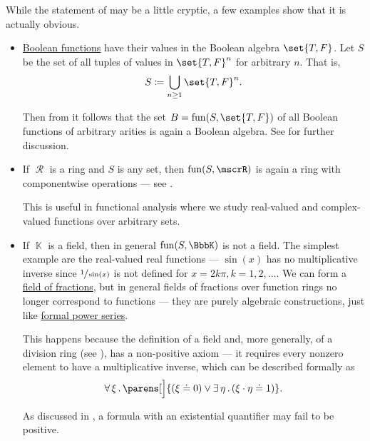 \begin{example}\label{ex:thm:functions_over_model_of_positive_formulas_form_model}
  While the statement of  may be a little cryptic, a few examples show that it is actually obvious.
  \begin{itemize}
    \item \hyperref[def:boolean_function]{Boolean functions} have their values in the Boolean algebra \( \set{ T, F } \). Let \( S \) be the set of all tuples of values in \( \set{ T, F }^n \) for arbitrary \( n \). That is,
    \begin{equation*}
      S \coloneqq \bigcup_{n \geq 1} \set{ T, F }^n.
    \end{equation*}

    Then from  it follows that the set \( B = \fun(S, \set{ T, F }) \) of all Boolean functions of arbitrary arities is again a Boolean algebra. See  for further discussion.

    \item If \( \mscrR \) is a ring and \( S \) is any set, then \( \fun(S, \mscrR) \) is again a ring with componentwise operations --- see .

    This is useful in functional analysis where we study real-valued and complex-valued functions over arbitrary sets.

    \item If \( \BbbK \) is a field, then in general \( \fun(S, \BbbK) \) is not a field. The simplest example are the real-valued real functions --- \( \sin(x) \) has no multiplicative inverse since \( \sfrac 1 {\sin(x)} \) is not defined for \( x = 2k\pi, k = 1, 2, \ldots \). We can form a \hyperref[def:field_of_fractions]{field of fractions}, but in general fields of fractions over function rings no longer correspond to functions --- they are purely algebraic constructions, just like \hyperref[def:formal_power_series]{formal power series}.

    This happens because the definition of a field and, more generally, of a division ring (see ), has a non-positive axiom --- it requires every nonzero element to have a multiplicative inverse, which can be described formally as
    \begin{equation*}
      \qforall \xi \parens[\Big]{ (\xi \doteq 0) \vee \qexists \eta (\xi \cdot \eta \doteq 1) }.
    \end{equation*}

    As discussed in , a formula with an existential quantifier may fail to be positive.
  \end{itemize}
\end{example}

